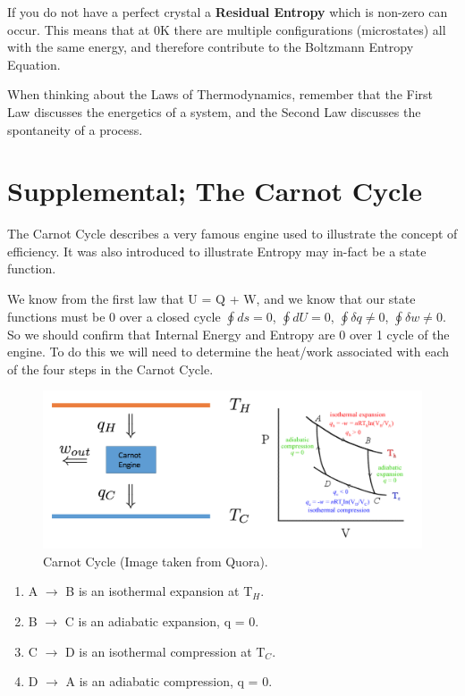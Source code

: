 \documentclass{article}
\newcommand{\benum}{\begin{enumerate}}
\newcommand{\eenum}{\end{enumerate}}
\begin{document}
If you do not have a perfect crystal a \textbf{Residual Entropy} which is non-zero can occur.
This means that at 0K there are multiple configurations (microstates) all with the same energy, and therefore contribute to the Boltzmann Entropy Equation. 

When thinking about the Laws of Thermodynamics, remember that the First Law discusses the energetics of a system, and the Second Law discusses the spontaneity of a process. 

\section*{Supplemental; The Carnot Cycle}
The Carnot Cycle describes a very famous engine used to illustrate the concept of efficiency. 
It was also introduced to illustrate Entropy may in-fact be a state function. 

We know from the first law that U = Q + W, and we know that our state functions must be 0 over a closed cycle $\oint ds = 0$, $\oint dU = 0$, $\oint \delta q \neq 0$, $\oint \delta w \neq 0$.
So we should confirm that Internal Energy and Entropy are 0 over 1 cycle of the engine.
To do this we will need to determine the heat/work associated with each of the four steps in the Carnot Cycle.

\begin{figure}[h]
    \centering
    \includegraphics[width=17cm]{carnot.png}
    \caption{Carnot Cycle (Image taken from Quora).}
    \label{fig:carnot}
\end{figure}

\benum
    \item A $\rightarrow$ B is an isothermal expansion at T$_H$. 
    \item B $\rightarrow$ C is an adiabatic expansion, q = 0. 
    \item C $\rightarrow$ D is an isothermal compression at T$_C$. 
    \item D $\rightarrow$ A is an adiabatic compression, q = 0.     
\eenum
\end{document}
